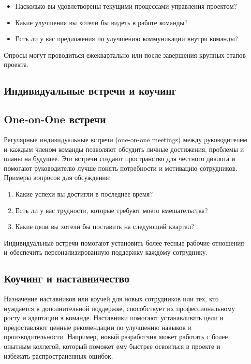     \begin{itemize}
        \item Насколько вы удовлетворены текущими процессами управления проектом?
        \item Какие улучшения вы хотели бы видеть в работе команды?
        \item Есть ли у вас предложения по улучшению коммуникации внутри команды?
    \end{itemize}
    
    Опросы могут проводиться ежеквартально или после завершения крупных этапов проекта.

    \subsection*{Индивидуальные встречи и коучинг}

    \subsection*{One-on-One встречи}
    Регулярные индивидуальные встречи (one-on-one meetings) между руководителем и каждым членом команды позволяют обсудить личные достижения, проблемы и планы на будущее. Эти встречи создают пространство для честного диалога и помогают руководителю лучше понять потребности и мотивацию сотрудников. Примеры вопросов для обсуждения:
    
    \begin{enumerate}
        \item Какие успехи вы достигли в последнее время?
        \item Есть ли у вас трудности, которые требуют моего вмешательства?
        \item Какие цели вы хотели бы поставить на следующий квартал?
    \end{enumerate}
    
    Индивидуальные встречи помогают установить более тесные рабочие отношения и обеспечить персонализированную поддержку каждому сотруднику.

    \subsection*{Коучинг и наставничество}
    Назначение наставников или коучей для новых сотрудников или тех, кто нуждается в дополнительной поддержке, способствует их профессиональному росту и адаптации в команде. Наставники помогают устанавливать цели и предоставляют ценные рекомендации по улучшению навыков и производительности. Например, новый разработчик может работать с более опытным коллегой, который поможет ему быстрее освоиться в проекте и избежать распространенных ошибок.

